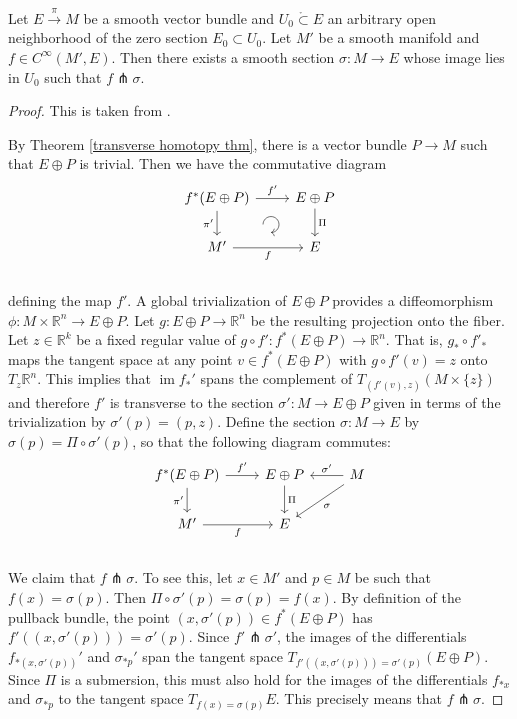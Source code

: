 \documentclass[english,letterpaper]{article}%
\numberwithin{equation}{section}
\numberwithin{figure}{section}
\numberwithin{table}{section}
\theoremstyle{definition}
\theoremstyle{definition}
\theoremstyle{definition}
\theoremstyle{plain}
\theoremstyle{plain}
\theoremstyle{plain}
\theoremstyle{plain}
\theoremstyle{remark}
\theoremstyle{remark}
\DeclareMathOperator{\im}{im}
\begin{document}
\begin{thm}\label{transverse section thm}
Let $E\overset{\pi}{\to}M$ be a smooth vector bundle and $U_0\mathring{\subset}E$ an arbitrary open neighborhood of the zero section $E_0\subset U_0$. Let $M'$ be a smooth manifold and $f\in C^\infty(M',E)$. Then there exists a smooth section $\sigma:M\to E$ whose image lies in $U_0$ such that $f\pitchfork \sigma$.
\end{thm}
\begin{proof}
This is taken from \cite[Thm. II.15.3]{Bredon}.

By Theorem \ref{transverse homotopy thm}, there is a vector bundle $P{\to} M$ such that $E\oplus P$ is trivial. Then we have the commutative diagram
    \[\begin{tikzcd}[every matrix/.append style={name=m}, execute at end picture={\draw [<-] ([xshift=-11mm,yshift=1mm]m-2-2.north) arc[start angle=-90,delta angle=270,radius=0.2cm];}]
    f^\ast(E\oplus P) \arrow[r,"f'"]\arrow[d,swap,"\pi'"]& E\oplus P\arrow[d,"\Pi"] \\
    M'\arrow[r,swap,"f"]& E\\
    \end{tikzcd}\]
defining the map $f'$. A global trivialization of $E\oplus P$ provides a diffeomorphism $\phi:M\times\mathbb{R}^n\to E\oplus P$. Let $g:E\oplus P\to\mathbb{R}^n$ be the resulting projection onto the fiber. Let $z\in\mathbb{R}^k$ be a fixed regular value of $g\circ f':f^\ast(E\oplus P)\to\mathbb{R}^n$. That is, $g_\ast \circ f'_\ast$ maps the tangent space at any point $v\in f^\ast(E\oplus P)$ with $g\circ f'(v)=z$ onto $T_z\mathbb{R}^n$. This implies that $\im f_\ast '$ spans the complement of $T_{(f'(v),z)}(M\times\{z\})$ and therefore $f'$ is transverse to the section $\sigma':M\to E\oplus P$ given in terms of the trivialization by $\sigma'(p)=(p,z)$. Define the section $\sigma:M\to E$ by $\sigma(p)=\Pi\circ \sigma'(p)$, so that the following diagram commutes:
  \[\begin{tikzcd}
    f^\ast(E\oplus P) \arrow[r,"f'"]\arrow[d,swap,"\pi'"]& E\oplus P\arrow[d,"\Pi"]& M\arrow[l,swap,"\sigma'"] \arrow[dl,"\sigma"]\\
    M'\arrow[r,swap,"f"]& E &\\
    \end{tikzcd}\]
We claim that $f\pitchfork \sigma$. To see this, let $x\in M'$ and $p\in M$ be such that $f(x)=\sigma(p)$. Then $\Pi\circ\sigma'(p)=\sigma(p)=f(x)$. By definition of the pullback bundle, the point $(x,\sigma'(p))\in f^\ast(E\oplus P)$ has $f'((x,\sigma'(p)))=\sigma'(p)$. Since $f'\pitchfork \sigma'$, the images of the differentials $f_{\ast(x,\sigma'(p))} '$ and $\sigma_{\ast p}'$ span the tangent space $T_{f'((x,\sigma'(p)))=\sigma'(p)}(E\oplus P)$. Since $\Pi$ is a submersion, this must also hold for the images of the differentials $f_{\ast x}$ and $\sigma_{\ast p}$ to the tangent space $T_{f(x)=\sigma(p)}E$. This precisely means that $f\pitchfork\sigma$.


\end{proof}
\end{document}
